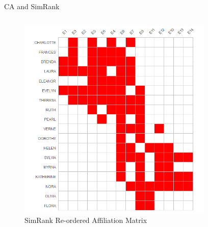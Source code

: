 \documentclass[
  ignorenonframetext,
]{beamer}
\begin{document}
\begin{frame}{CA and SimRank}
\protect\hypertarget{ca-and-simrank-5}{}
\begin{columns}[T]
\begin{column}{0.5\textwidth}
\begin{figure}

{\centering \includegraphics{Plots/sr-plot-reord.png}

}

\caption{SimRank Re-ordered Affiliation Matrix}

\end{figure}
\end{column}

\begin{column}{0.3\textwidth}
\begin{figure}


\end{figure}
\end{column}
\end{columns}
\end{frame}
\end{document}
